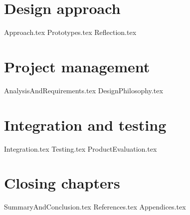 \documentclass{article} %
\begin{document}
\newpage
\section{Design approach}
{Approach.tex}
{Prototypes.tex}
{Reflection.tex}

\newpage
\section{Project management}
{AnalysisAndRequirements.tex}
{DesignPhilosophy.tex}

\newpage
\section{Integration and testing}
{Integration.tex}
{Testing.tex}
{ProductEvaluation.tex}

\newpage
\section{Closing chapters} %
{SummaryAndConclusion.tex}
{References.tex}
{Appendices.tex}
\end{document}
